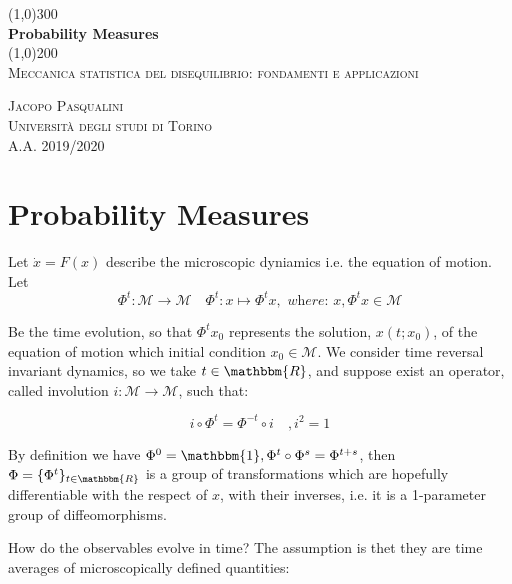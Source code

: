 \documentclass{article}
\begin{document}
\begin{titlepage}
	\begin{center}
	
	\line(1,0){300}\\
	[5mm]
	\huge{\bfseries Probability Measures}\\
	[2mm]
	\line(1,0){200}\\
	[2cm]
	\textsc{\Large Meccanica statistica del disequilibrio: fondamenti e applicazioni} \\
	[8cm]
	
	\end{center}
	
	\begin{flushright}
	\textsc{\LARGE Jacopo Pasqualini}\\
	[0.5cm]
	\textsc{\large Università degli studi di Torino\\
	[0.5cm]
	A.A. 2019/2020 }
	\end{flushright}
	
\end{titlepage}

\section{Probability Measures}\label{sec:langapp}

Let $\dot{x} = F(x)$ describe the microscopic dyniamics i.e. the equation of motion. Let 
$$\Phi^t: \mathcal{M} \longrightarrow \mathcal{M} \quad \Phi^t : x \longmapsto \Phi^t x, \textit{ where: } x,\Phi^t x \in \mathcal{M} $$

Be the time evolution, so that $\Phi^t x_0$ represents the solution, $x(t;x_0)$, of the equation of motion which initial condition $x_0 \in \mathcal{M}$. We consider time reversal invariant dynamics, so we take $t \in \mathbbm{R}$, and suppose exist an operator, called involution $i:\mathcal{M}\longrightarrow \mathcal{M}$, such that:

\begin{equation}
i \circ \Phi^t = \Phi^{-t} \circ i \quad , i^2 = 1
\end{equation}

By definition we have $\Phi^0 = \mathbbm{1}, \Phi^t \circ \Phi^s = \Phi^{t+s} $, then $\Phi = \{ \Phi^t\}_{t \in \mathbbm{R}}$ is a group of transformations which are hopefully differentiable with the respect of $x$, with their inverses, i.e. it is a 1-parameter group of diffeomorphisms.

How do the observables evolve in time? The assumption is thet they are time averages of microscopically defined quantities:
\end{document}
